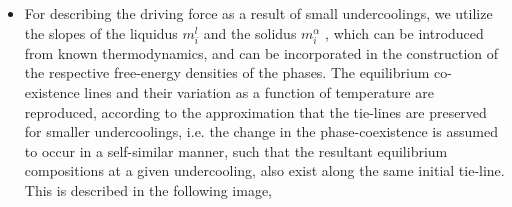 \documentclass[a4paper,10pt]{article}
\begin{document}
\begin{itemize}
\item For describing the driving force as a result of small
undercoolings, we utilize the slopes of the liquidus $m_i^{l}$ and the solidus $m_{i}^{\alpha}$ , 
which can be introduced from known thermodynamics, and can be incorporated in the construction of the 
respective free-energy densities of the phases.  The equilibrium co-existence 
lines and their variation as a function of temperature are reproduced, 
according to the approximation that the tie-lines are preserved for 
smaller undercoolings, i.e. the change in the phase-coexistence
is assumed to occur in a self-similar manner, such that the resultant 
equilibrium compositions at a given undercooling, also exist along the same initial tie-line.
This is described in the following image,

\begin{figure}[!htbp]
\begin{center}
\end{center}
\end{figure}
\end{itemize}
\end{document}
